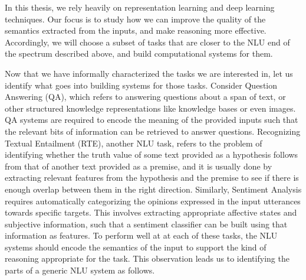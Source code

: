 In this thesis, we rely heavily on representation learning and deep learning techniques. Our focus
is to study how we can improve the quality of the semantics extracted from the inputs, and make
reasoning more effective.  Accordingly, we will choose a subset of tasks that are closer to the NLU
end of the spectrum described above, and build computational systems for them.

Now that we have informally characterized the tasks we are interested in,
let us identify what goes into building systems for those tasks.  Consider Question Answering (QA),
which refers to answering questions about a span of text, or other structured knowledge
representations like knowledge bases or even images.  QA systems are required to encode the meaning
of the provided inputs such that the relevant bits of information can be retrieved to answer
questions.  Recognizing Textual Entailment (RTE), another NLU task, refers to the problem of
identifying whether the truth value of some text provided as a hypothesis follows from that of
another text provided as a premise, and it is usually done by extracting relevant features from the
hypothesis and the premise to see if there is enough overlap between them in the right direction.
Similarly, Sentiment Analysis requires automatically categorizing the opinions expressed in the
input utterances towards specific targets. This involves extracting appropriate affective states and
subjective information, such that a sentiment classifier can be built using that information as
features. To perform well at at each of these tasks, the NLU systems should encode the semantics of
the input to support the kind of reasoning appropriate for the task. This observation leads us to identifying the
parts of a generic NLU system as follows.


